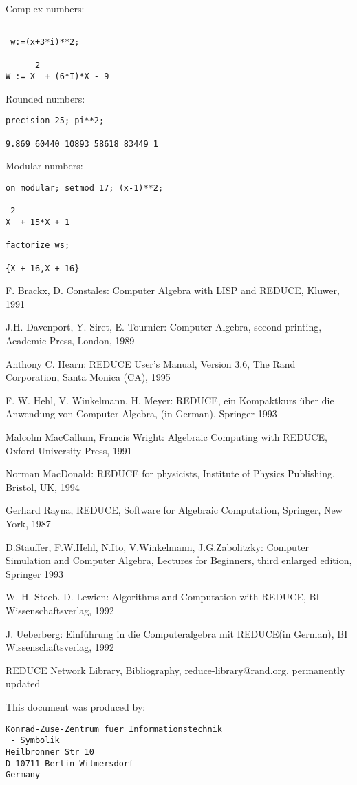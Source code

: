 Complex numbers:
\begin{verbatim}
 
 w:=(x+3*i)**2;

      2
W := X  + (6*I)*X - 9
\end{verbatim}
Rounded numbers:
\begin{verbatim} 
precision 25; pi**2;

9.869 60440 10893 58618 83449 1
\end{verbatim}
Modular numbers:
\begin{verbatim} 
on modular; setmod 17; (x-1)**2;

 2
X  + 15*X + 1

factorize ws;

{X + 16,X + 16}
\end{verbatim}
\begin{thebibliography}{9}

\item F. Brackx, D. Constales: Computer Algebra with
{\small LISP} and {\small REDUCE}, Kluwer, 1991

\item J.H. Davenport, Y. Siret, E. Tournier: Computer Algebra,
second printing, Academic Press, London, 1989

\item Anthony C. Hearn: {\small REDUCE} User's Manual, Version 3.6,
The Rand Corporation, Santa Monica (CA), 1995

\item F. W. Hehl, V. Winkelmann, H. Meyer:
{\small REDUCE}, ein Kompaktkurs \"uber die Anwendung von Computer-Algebra,
(in German), Springer 1993               

\item Malcolm MacCallum, Francis Wright:
Algebraic Computing with {\small REDUCE},
Oxford University Press, 1991

\item Norman MacDonald:  {\small REDUCE} for physicists,
Institute of Physics Publishing, Bristol, UK, 1994

\item Gerhard Rayna, {\small REDUCE}, Software for Algebraic Computation,
Springer, New York, 1987

\item D.Stauffer, F.W.Hehl, N.Ito, V.Winkelmann, J.G.Zabolitzky:
 Computer Simulation and Computer Algebra, Lectures for Beginners,
 third enlarged edition, Springer 1993

\bibitem W.-H. Steeb. D. Lewien: Algorithms and Computation with
{\small REDUCE}, BI Wissenschaftsverlag, 1992

\item J. Ueberberg: Einf\"uhrung in die Computeralgebra
mit {\small REDUCE}(in German), BI Wissenschaftsverlag, 1992

\item {\small REDUCE} Network Library, Bibliography,
reduce-library@rand.org, permanently updated
\end{thebibliography}
This document was produced by:
\vspace*{-5mm}
\begin{verbatim}
Konrad-Zuse-Zentrum fuer Informationstechnik
 - Symbolik
Heilbronner Str 10
D 10711 Berlin Wilmersdorf
Germany
\end{verbatim}


